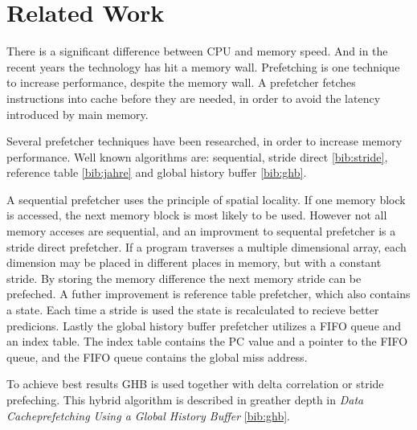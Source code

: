 \section{Related Work}
\label{sec:related-work}

There is a significant difference between CPU and memory speed.
And in the recent years the technology has hit a memory wall.
Prefetching is one technique to increase performance, despite the memory wall.
A prefetcher fetches instructions into cache before they are needed,
in order to avoid the latency introduced by main memory.

Several prefetcher techniques have been researched, in order to increase memory performance.
Well known algorithms are: sequential, stride direct \ref{bib:stride}, reference table \ref{bib:jahre} and global history buffer \ref{bib:ghb}.

A sequential prefetcher uses the principle of spatial locality.
If one memory block is accessed, the next memory block is most likely to be used.
However not all memory acceses are sequential,
and an improvment to sequental prefetcher is a stride direct prefetcher.
If a program traverses a multiple dimensional array,
each dimension may be placed in different places in memory,
but with a constant stride.
By storing the memory difference the next memory stride can be prefeched.
A futher improvement is reference table prefetcher,
which also contains a state.
Each time a stride is used the state is recalculated to recieve better predicions.
Lastly the global history buffer prefetcher utilizes a FIFO queue and an index table.
The index table contains the PC value and a pointer to the FIFO queue,
and the FIFO queue contains the global miss address.

To achieve best results GHB is used together with delta correlation or stride prefeching.
This hybrid algorithm is described in greather depth in \textit{Data Cacheprefetching Using a Global History Buffer} \ref{bib:ghb}.
